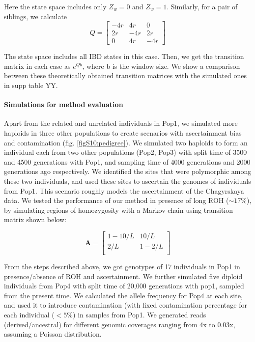 \documentclass[12pt, letterpaper]{article}
\begin{document}
Here the state space includes only $Z_w=0$ and $Z_w=1$. Similarly, for a pair of siblings, we calculate $$Q =  
\left[\begin{array}
{rrr}
-4r & 4r & 0\\
2r & -4r & 2r\\
0 & 4r & -4r
\end{array}\right]$$   

The state space includes all IBD states in this case. Then, we get the transition matrix in each case as $e^{Qb}$, where b is the window size. We show a comparison between these theoretically obtained transition matrices with the simulated ones in supp table YY.


\paragraph{Simulations for method evaluation}
Apart from the related and unrelated individuals in Pop1, we simulated more haploids in three other populations to create scenarios with ascertainment bias and contamination (fig. \ref{figS10:pedigree}). We simulated two haploids to form an individual each from two other populations (Pop2, Pop3) with split time of 3500 and 4500 generations with Pop1, and sampling time of 4000 generations and 2000 generations ago respectively.  We identified the sites that were polymorphic among these two individuals, and used these sites to ascertain the genomes of individuals from Pop1. This scenario roughly models the ascertainment of the Chagyrskaya  data. We tested the performance of our method in presence of long ROH ($\sim17\%$), by simulating regions of homozygosity with a Markov chain using transition matrix shown below: 

$$\mathbf{A} = \left[\begin{array}
{rr}
1-10/L & 10/L \\
2/L & 1-2/L  \\
\end{array}\right]
$$

From the steps described above, we got genotypes of 17 individuals in Pop1 in presence/absence of ROH and ascertainment. We further simulated five diploid individuals from Pop4 with split time of 20,000 generations with pop1, sampled from the present time. We calculated the allele frequency for Pop4 at each site, and used it to introduce contamination (with fixed contamination percentage for each individual ($<5\%$) in samples from Pop1. We generated reads (derived/ancestral) for different genomic coverages ranging from 4x to 0.03x, assuming a Poisson distribution.
\end{document}
